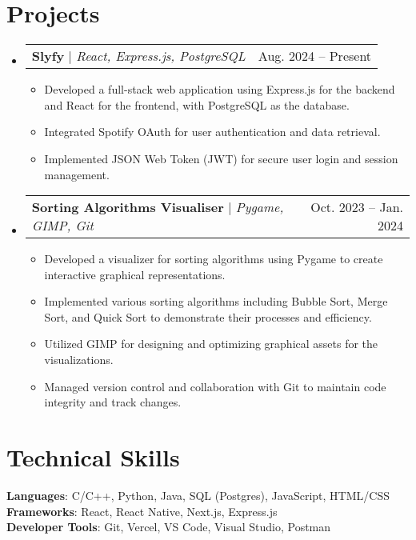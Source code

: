\documentclass[letterpaper,11pt]{article}
\makeatletter
\newcommand{\resumeItem}[1]{
  \item\small{
    {#1 \vspace{-2pt}}
  }
}
\newcommand{\resumeProjectHeading}[2]{
    \item
    \begin{tabular*}{0.97\textwidth}{l@{\extracolsep{\fill}}r}
      \small#1 & #2 \\
    \end{tabular*}\vspace{-7pt}
}
\newcommand{\resumeSubHeadingListStart}{\begin{itemize}[leftmargin=0.15in, label={}]}
\newcommand{\resumeSubHeadingListEnd}{\end{itemize}}
\newcommand{\resumeItemListStart}{\begin{itemize}}
\newcommand{\resumeItemListEnd}{\end{itemize}\vspace{-5pt}}
\makeatother
\begin{document}
\section{Projects}
    \resumeSubHeadingListStart
      \resumeProjectHeading
        {\textbf{Slyfy} $|$ \emph{React, Express.js, PostgreSQL}}{Aug. 2024 -- Present}
        \resumeItemListStart
            \resumeItem{Developed a full-stack web application using Express.js for the backend and React for the frontend, with PostgreSQL as the database.}
            \resumeItem{Integrated Spotify OAuth for user authentication and data retrieval.}
            \resumeItem{Implemented JSON Web Token (JWT) for secure user login and session management.}
        \resumeItemListEnd
      \resumeProjectHeading
    {\textbf{Sorting Algorithms Visualiser} $|$ \emph{Pygame, GIMP, Git}}{Oct. 2023 -- Jan. 2024}
    \resumeItemListStart
        \resumeItem{Developed a visualizer for sorting algorithms using Pygame to create interactive graphical representations.}
        \resumeItem{Implemented various sorting algorithms including Bubble Sort, Merge Sort, and Quick Sort to demonstrate their processes and efficiency.}
        \resumeItem{Utilized GIMP for designing and optimizing graphical assets for the visualizations.}
        \resumeItem{Managed version control and collaboration with Git to maintain code integrity and track changes.}
    \resumeItemListEnd
    \resumeSubHeadingListEnd



%
\section{Technical Skills}
 \begin{itemize}[leftmargin=0.15in, label={}]
    \small{\item{
     \textbf{Languages}{: C/C++, Python, Java, SQL (Postgres), JavaScript, HTML/CSS} \\
     \textbf{Frameworks}{: React, React Native, Next.js, Express.js} \\
     \textbf{Developer Tools}{: Git, Vercel, VS Code, Visual Studio, Postman} \\
    }}
 \end{itemize}


\end{document}
